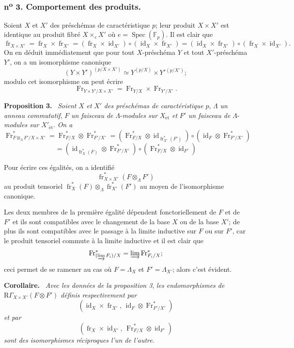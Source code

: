 \documentclass[11pt]{article}
\newenvironment{statement}[1]{\par\medskip\noindent\textbf{#1.}\ }{\par\medskip}
\DeclareMathOperator{\Spec}{Spec}
\providecommand{\et}{\mathrm{\acute{e}t}}
\providecommand{\id}{\operatorname{id}}
\providecommand{\id}{\operatorname{id}}
\providecommand{\id}{\operatorname{id}}
\providecommand{\id}{\operatorname{id}}
\providecommand{\Spec}{\operatorname{Spec}}
\providecommand{\Spec}{\operatorname{Spec}}
\providecommand{\id}{\operatorname{id}}
\providecommand{\Spec}{\operatorname{Spec}}
\providecommand{\fr}{\operatorname{fr}}
\providecommand{\Fr}{\operatorname{Fr}}
\providecommand{\Fr}{\operatorname{Fr}}
\providecommand{\fr}{\operatorname{fr}}
\providecommand{\Spec}{\operatorname{Spec}}
\providecommand{\id}{\operatorname{id}}
\providecommand{\et}{\acute{e}t}
\begin{document}
\subsubsection*{n\textsuperscript{o} 3. Comportement des produits.}

Soient $X$ et $X'$ des préschémas de caractéristique $p$; leur produit $X\times X'$ est identique au produit fibré $X\times_eX'$ où $e=\Spec(\mathbb F_p)$. Il est clair que
\[
\fr_{X\times X'}=\fr_X\times\fr_{X'}=(\fr_X\times\id_{X'})\circ(\id_X\times\fr_{X'})
=(\id_X\times\fr_{X'})\circ(\fr_X\times\id_{X'}).
\]
On en déduit immédiatement que pour tout $X$-préschéma $Y$ et tout $X'$-préschéma $Y'$, on a un isomorphisme canonique
\[
(Y\times Y')^{(p/X\times X')}\simeq Y^{(p/X)}\times Y'{}^{(p/X')};
\]
modulo cet isomorphisme on
peut écrire
\[
\Fr_{Y\times Y'/X\times X'}=\Fr_{Y/X}\times\Fr_{Y'/X'}.
\]

\begin{statement}{Proposition 3}
\emph{Soient} $X$ \emph{et} $X'$ \emph{des préschémas de caractéristique} $p$, $\Lambda$ \emph{un anneau commutatif}, $F$ \emph{un faisceau de} $\Lambda$-\emph{modules sur} $X_{\et}$ \emph{et} $F'$ \emph{un faisceau de} $\Lambda$-\emph{modules sur} $X'_{\et}$. \emph{On a}
\[
\Fr^*_{F\otimes_\Lambda F'/X\times X'}
=\Fr^*_{F/X}\otimes\Fr^*_{F'/X'}
=(\Fr^*_{F/X}\otimes\id_{\fr_{X'}^*(F')})\circ
(\id_F\otimes\Fr^*_{F'/X'})
\]
\[
=(\id_{\fr_X^*(F)}\otimes\Fr^*_{F'/X'})\circ
(\Fr^*_{F/X}\otimes\id_{F'})
\]
\end{statement}

Pour écrire ces égalités, on a identifié
\[
\fr_{X\times X'}^*(F\otimes_\Lambda F')
\]
au produit tensoriel $\fr_X^*(F)\otimes_\Lambda\fr_{X'}^*(F')$ au moyen de l'isomorphisme canonique.

Les deux membres de la première égalité dépendent fonctoriellement de $F$ et de $F'$ et ils sont compatibles avec le changement de la base $X$ ou de la base $X'$; de plus ils sont compatibles avec le passage à la limite inductive sur $F$ ou sur $F'$, car le produit tensoriel commute à la limite inductive et il est clair que
\[
\Fr^*_{(\varinjlim F_i)/X}=\varinjlim\Fr^*_{F_i/X};
\]
ceci permet de se ramener au cas où $F=\Lambda_X$ et $F'=\Lambda_{X'}$; alors c'est évident.

\begin{statement}{Corollaire}
\emph{Avec les données de la proposition 3}, \emph{les endomorphismes de} $\mathrm{R}\Gamma_{X\times X'}(F\otimes F')$ \emph{définis respectivement par}
\[
(\id_X\times\fr_{X'},\,\id_F\otimes\Fr^*_{F'/X'})
\]
\emph{et par}
\[
(\fr_X\times\id_{X'},\,\Fr^*_{F/X}\otimes\id_{F'})
\]
\emph{sont des isomorphismes réciproques l'un de l'autre}.
\end{statement}
\end{document}
